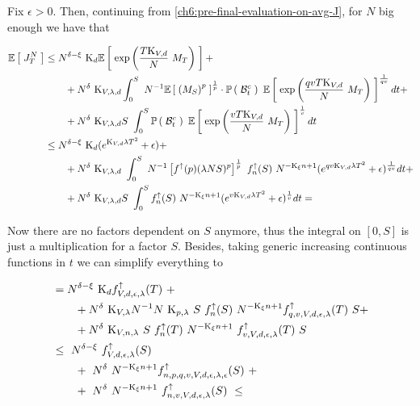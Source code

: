 Fix $\epsilon>0$. Then, continuing from \ref{ch6:pre-final-evaluation-on-avg-J}, for $N$ big enough we have that

\begin{align*}
	\mathbb{E} \left[ \; J_T^N \; \right] 
	&\leq
	N^{\delta-\xi}\
	\text{K}_{d}
	\mathbb{E} \left[ \; 
		\exp \left(
		\frac{T
			\text{K}_{V,d}
			}{N}\
		M_T
		\right)
	 \; \right] +
	\\
	&\qquad
	+ N^{\delta}\
	\text{K}_{V, \lambda,d}
	\int_0^S\
	N^{-1}
	\mathbb{E} \left[ \; 
		\left(M_S
		\right)^p
	 \; \right]^{\frac{1}{p}}
	\cdot
	\mathbb{P} \left( \; \mathcal{B}_t^c \; \right)\
	\mathbb{E} \left[ \; 
		\exp \left(
		\frac{qvT
			\text{K}_{V,d}
			}{N}\
		M_T
		\right)
	 \; \right]^\frac{1}{qv}
	dt +
	\\
	&\qquad
	+ N^{\delta}\
	\text{K}_{V, \lambda,d}
	S\
	\int_0^S
	\mathbb{P} \left( \; \mathcal{B}_t^c \; \right)\
	\mathbb{E} \left[ \; 
		\exp \left(
		\frac{vT
			\text{K}_{V,d}
			}{N}\
		M_T
		\right)
	 \; \right]^{\frac{1}{v}}
	dt
	\\
	&\leq
	N^{\delta-\xi}\
	\text{K}_{d}
	(e^{
		\text{K}_{V,d}
		\lambda T^2} + \epsilon)+
	\\
	&\qquad
	+ N^{\delta}\
	\text{K}_{V,\lambda,d}\
	\int_0^S\
	N^{-1}
	\left[f^\uparrow(p) (\lambda N S)^p\right]^{\frac{1}{p}}\
		f^\uparrow_n(S)\
		N^{-\text{K}_\xi n + 1}
		(e^{qv
			\text{K}_{V,d}
			\lambda T^2} + \epsilon)^\frac{1}{qv}
	dt +
	\\
	&\qquad
	+ N^{\delta}\
	\text{K}_{V,\lambda,d}
	S\
	\int_0^S
		f^\uparrow_n(S)\
		N^{-\text{K}_\xi n + 1}
		(e^{v
			\text{K}_{V,d}
			\lambda T^2} + \epsilon)^\frac{1}{v}
	dt
	=
\end{align*}

Now there are no factors dependent on $S$ anymore, thus the integral on $[0,S]$ is just a multiplication for a factor $S$.
Besides, taking generic increasing continuous functions in $t$ we can simplify everything to

\begin{align*}
	& =
		N^{\delta-\xi}\
		\text{K}_{d}
		f^\uparrow_{V,d,\epsilon,\lambda}(T)\
		+
	\\
	&\qquad
		+
		N^{\delta}\
		\text{K}_{V,\lambda}
		N^{-1}N\
		\text{K}_{p,\lambda}\
		S\
		f^\uparrow_n(S)\
		N^{-\text{K}_\xi n + 1}
		f^\uparrow_{q,v,V,d,\epsilon,\lambda}(T)\
		S+
	\\
	&\qquad
	+ N^{\delta}\
	\text{K}_{V,n,\lambda}\
	S\
	f^\uparrow_n(T)\
	N^{-\text{K}_\xi n+ 1}\
	f^\uparrow_{v,V,d,\epsilon,\lambda}(T)\
	S
	\\
	&
	\leq\
		N^{\delta-\xi}\
		f^\uparrow_{V,d,\epsilon,\lambda}(S)\
		\\
		&\qquad
		+\
		N^{\delta}\
		N^{-\text{K}_\xi n + 1}
		f^\uparrow_{n,p,q,v,V,d,\epsilon,\lambda, \epsilon}(S)\
		+
	\\
	&\qquad
	+\
	N^{\delta}\
	N^{-\text{K}_\xi n+ 1}\
	f^\uparrow_{n,v,V,d,\epsilon,\lambda}(S)\
	\leq
\end{align*}

